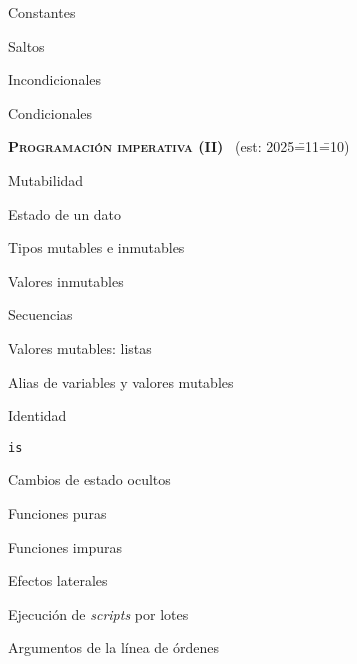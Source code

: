 \begin{longenum}
\begin{longenum}
\begin{longenum}
            \item Constantes
        \end{longenum}
        \item Saltos
        \begin{longenum}
            \item Incondicionales
            \item Condicionales
        \end{longenum}
    \end{longenum}
    \item \textbf{\textsc{Programación imperativa (II)}} \ (est: 2025\==11\==10)
    \begin{longenum}
        \item Mutabilidad
        \begin{longenum}
            \item Estado de un dato
            \item Tipos mutables e inmutables
            \begin{longenum}
                \item Valores inmutables
                \begin{longenum}
                    \item Secuencias
                \end{longenum}
                \item Valores mutables: listas
            \end{longenum}
            \item Alias de variables y valores mutables
            \item Identidad
            \begin{longenum}
                \item \texttt{is}
            \end{longenum}
        \end{longenum}
        \item Cambios de estado ocultos
        \begin{longenum}
            \item Funciones puras
            \item Funciones impuras
            \item Efectos laterales
            \item Ejecución de \textit{scripts} por lotes
            \begin{longenum}
                \item Argumentos de la línea de órdenes

\end{longenum}
\end{longenum}
\end{longenum}
\end{longenum}
